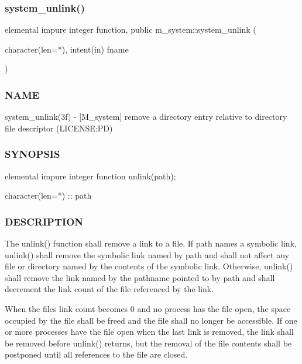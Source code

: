 \subsubsection{\texorpdfstring{system\+\_\+unlink()}{system\_unlink()}}
{\footnotesize\ttfamily elemental impure integer function, public m\+\_\+system\+::system\+\_\+unlink (\begin{DoxyParamCaption}\item[{character(len=$\ast$), intent(in)}]{fname }\end{DoxyParamCaption})}



\subsubsection*{N\+A\+ME}

system\+\_\+unlink(3f) -\/ \mbox{[}M\+\_\+system\mbox{]} remove a directory entry relative to directory file descriptor (L\+I\+C\+E\+N\+SE\+:PD) 

\subsubsection*{S\+Y\+N\+O\+P\+S\+IS}

\begin{DoxyVerb}elemental impure integer function unlink(path);

 character(len=*) :: path
\end{DoxyVerb}


\subsubsection*{D\+E\+S\+C\+R\+I\+P\+T\+I\+ON}

The unlink() function shall remove a link to a file. If path names a symbolic link, unlink() shall remove the symbolic link named by path and shall not affect any file or directory named by the contents of the symbolic link. Otherwise, unlink() shall remove the link named by the pathname pointed to by path and shall decrement the link count of the file referenced by the link.

When the file\textquotesingle{}s link count becomes 0 and no process has the file open, the space occupied by the file shall be freed and the file shall no longer be accessible. If one or more processes have the file open when the last link is removed, the link shall be removed before unlink() returns, but the removal of the file contents shall be postponed until all references to the file are closed.

